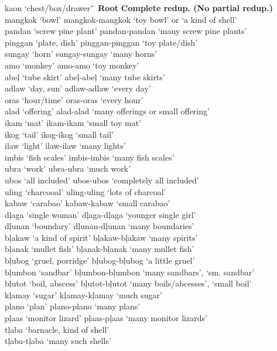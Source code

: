 \begin{tabbing}
kaon ‘chest/box/drawer’ \hspace{.1cm}  \=  \kill
\textbf{Root}  \>    \textbf{Complete redup. (No partial redup.)} \\
mangkok ‘bowl’ \>  mangkok-mangkok ‘toy bowl’ or ‘a kind of shell’ \\
pandan ‘screw pine plant’ \>  pandan-pandan ‘many screw pine plants’ \\
pinggan ‘plate, dish’ \>  pinggan-pinggan   ‘toy plate/dish’ \\
sungay ‘horn’ \>  sungay-sungay ‘many horns’ \\
amo ‘monkey’ \>  amo-amo ‘toy monkey’ \\
abeļ ‘tube skirt’ \>  abeļ-abeļ ‘many tube skirts’ \\
adlaw ‘day, sun’ \>  adlaw-adlaw ‘every day’ \\
oras `hour/time' \> oras-oras `every hour' \\
alad ‘offering' \>  alad-alad ‘many offerings or small offering’ \\
ikam ‘mat’ \>    ikam-ikam ‘small toy mat’ \\
ikog ‘tail’  \>   ikog-ikog ‘small tail’ \\
ilaw ‘light’  \>  ilaw-ilaw ‘many lights' \\
imbis ‘fish scales’ \>  imbis-imbis ‘many fish scales’ \\
ubra ‘work’ \>  ubra-ubra ‘much work’ \\
ubos ‘all included’ \>  ubos-ubos ‘completely all included’ \\
uling ‘charcooal’ \>  uling-uling ‘lots of  charcoal’ \\
kabaw ‘carabao’ \> kabaw-kabaw ‘small carabao’ \\
dļaga ‘single woman’ \>  dļaga-dļaga ‘younger single girl’ \\
dļunan ‘boundary’ \>  dļunan-dļunan ‘many boundaries’ \\
bļakaw ‘a kind of spirit’ \> bļakaw-bļakaw ‘many spirits’ \\
bļanak ‘mullet fish’ \>  bļanak-bļanak ‘many mullet fish’ \\
bļubog ‘gruel, porridge’ \>  bļubog-bļubog ‘a little gruel’ \\
bļumbon ‘sandbar’ \>  bļumbon-bļumbon ‘many sandbars', `sm. sandbar’ \\
bļutot ‘boil, abscess’ \> bļutot-bļutot ‘many boils/abcesses’, `small boil' \\
kļamay ‘sugar’ \>  kļamay-kļamay ‘much sugar’ \\
plano ‘plan’ \>  plano-plano ‘many plans’ \\
pļaas ‘monitor lizard’  \> pļaas-pļaas ‘many monitor lizards’ \\
tļaba ‘barnacle, kind of shell’ \\
\> tļaba-tļaba ‘many such shells’
\end{tabbing}
